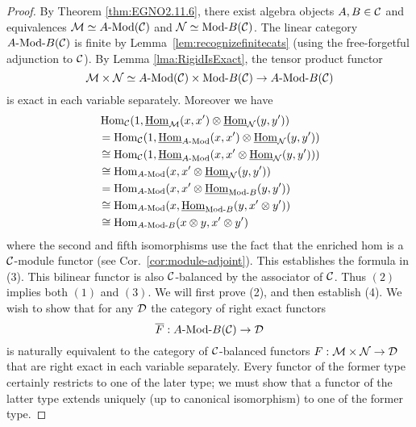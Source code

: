 \documentclass{amsart}
\begin{document}
\begin{proof}  
	 By Theorem \ref{thm:EGNO2.11.6}, there exist algebra objects $A, B \in \mathcal C$ and equivalences $\cM \simeq \Mod{A}{}(\cC)$ and $\cN \simeq \Mod{}{B}(\cC)$. The linear category $\Mod{A }{B}(\cC)$ is finite by Lemma~\ref{lem:recognizefinitecats} (using the free-forgetful adjunction to $\mathcal C$).
	 By Lemma \ref{lma:RigidIsExact}, the tensor product functor
	\begin{equation*}
		\cM \times \cN \simeq \Mod{A}{}(\cC) \times  \Mod{}{B}(\cC) \to \Mod{A}{B}(\cC)
	\end{equation*}
	is exact in each variable separately. Moreover we have
	\begin{align*}
		&\Hom_{\cC}(1, \IHom_{\cM}(x,x') \otimes \IHom_{\cN}(y, y')) \\
		& = \Hom_{\cC}(1, \IHom_{\Mod{A}{}}(x,x') \otimes \IHom_{\cN}(y, y')) \\
		&\cong \Hom_{\cC}(1, \IHom_{\Mod{A}{}}(x,x' \otimes \IHom_{\cN}(y, y')) ) \\
		& \cong \Hom_{\Mod{A}{}}(x, x' \otimes \IHom_{\cN}(y, y') ) \\
		& = \Hom_{\Mod{A}{}}(x, x' \otimes \IHom_{\Mod{}{B}}(y, y') )\\
		& \cong \Hom_{\Mod{A}{}}(x,  \IHom_{\Mod{}{B}}(y, x' \otimes y') )\\
		& \cong \Hom_{\Mod{A}{B}}(x \otimes y, x' \otimes y')
	\end{align*} 
where the second and fifth isomorphisms use the fact that the enriched hom is a $\mathcal C$-module functor (see Cor.~\ref{cor:module-adjoint}). This establishes the formula in (3). This bilinear functor is also $\mathcal C$-balanced by the associator of $\mathcal C$. Thus $(2)$ implies both  $(1)$ and $(3)$. 
	We will first prove (2), and then establish (4).  We wish to show that for any $\mathcal D$ the category of right exact functors 
\begin{equation*}
	\overline{F}:\Mod{A}{B}(\cC) \to \cD
\end{equation*}
	is naturally equivalent to the category of $\mathcal C$-balanced functors $F:\mathcal M \times \mathcal N \to \mathcal D$ that are right exact in each variable separately. Every functor of the former type certainly restricts to one of the later type; we must show that a functor of the latter type extends uniquely (up to canonical isomorphism) to one of the former type.  
	

\end{proof}
\end{document}

